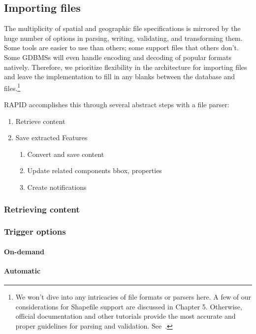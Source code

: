 \subsection{Importing files}
The multiplicity of spatial and geographic file specifications is mirrored by the huge number of options in parsing, writing, validating, and transforming them. Some tools are easier to use than others; some support files that others don't. Some GDBMSs will even handle encoding and decoding of popular formats natively. Therefore, we prioritize flexibility in the architecture for importing files and leave the implementation to fill in any blanks between the database and files.\footnote{We won't dive into any intricacies of file formats or parsers here. A few of our considerations for Shapefile support are discussed in Chapter 5. Otherwise, official documentation and other tutorials provide the most accurate and proper guidelines for parsing and validation. See~\cite{}.}

RAPID accomplishes this through several abstract steps with a file parser:

 \begin{enumerate}
   \item Retrieve content
   \item Save extracted Features
   \begin{enumerate}
     \item Convert and save content
     \item Update related components
                     bbox, properties
     \item Create notifications
   \end{enumerate}
 \end{enumerate}
 
 \subsubsection{Retrieving content}
 
 \subsubsection{Trigger options}
\paragraph{On-demand}
\paragraph{Automatic}
 
